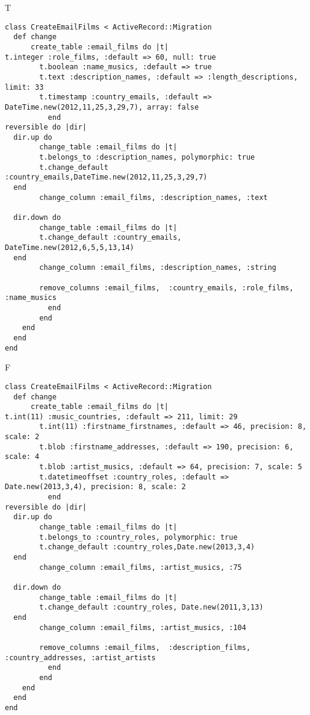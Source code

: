 T
\begin{verbatim}
class CreateEmailFilms < ActiveRecord::Migration
  def change
	  create_table :email_films do |t|
t.integer :role_films, :default => 60, null: true
		t.boolean :name_musics, :default => true
		t.text :description_names, :default => :length_descriptions, limit: 33
		t.timestamp :country_emails, :default => DateTime.new(2012,11,25,3,29,7), array: false
		  end
reversible do |dir|
  dir.up do
		change_table :email_films do |t|
		t.belongs_to :description_names, polymorphic: true
 		t.change_default :country_emails,DateTime.new(2012,11,25,3,29,7)
  end
 		change_column :email_films, :description_names, :text
   
  dir.down do
		change_table :email_films do |t|
		t.change_default :country_emails, DateTime.new(2012,6,5,5,13,14)
  end
 		change_column :email_films, :description_names, :string
   
		remove_columns :email_films,  :country_emails, :role_films, :name_musics 
	      end
	    end
    end 
  end
end

\end{verbatim}

F
\begin{verbatim}
class CreateEmailFilms < ActiveRecord::Migration
  def change
	  create_table :email_films do |t|
t.int(11) :music_countries, :default => 211, limit: 29
		t.int(11) :firstname_firstnames, :default => 46, precision: 8, scale: 2
		t.blob :firstname_addresses, :default => 190, precision: 6, scale: 4
		t.blob :artist_musics, :default => 64, precision: 7, scale: 5
		t.datetimeoffset :country_roles, :default => Date.new(2013,3,4), precision: 8, scale: 2
		  end
reversible do |dir|
  dir.up do
		change_table :email_films do |t|
		t.belongs_to :country_roles, polymorphic: true
 		t.change_default :country_roles,Date.new(2013,3,4)
  end
 		change_column :email_films, :artist_musics, :75
   
  dir.down do
		change_table :email_films do |t|
		t.change_default :country_roles, Date.new(2011,3,13)
  end
 		change_column :email_films, :artist_musics, :104
   
		remove_columns :email_films,  :description_films, :country_addresses, :artist_artists 
	      end
	    end
    end 
  end
end

\end{verbatim}

